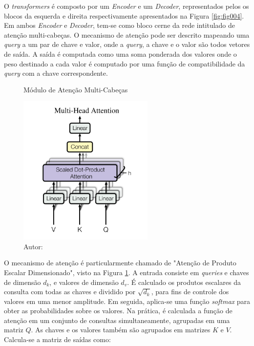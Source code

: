O \textit{transformers} é composto por um \textit{Encoder} e um \textit{Decoder}, representados pelos os blocos da esquerda e direita respectivamente apresentados na Figura \ref{fig:fig004}. Em ambos \textit{Encoder} e \textit{Decoder}, tem-se como bloco cerne da rede intitulado de atenção multi-cabeças. O mecanismo de atenção pode ser descrito mapeando uma \textit{query} a um par de chave e valor, onde a \textit{query}, a chave e o valor são todos vetores de saída. A saída é computada como uma soma ponderada dos valores onde o peso destinado a cada valor é computado por uma função de compatibilidade da \textit{query} com a chave correspondente.

\begin{figure}[htbp]
    \centering
    \caption{Módulo de Atenção Multi-Cabeças}
    \includegraphics[width=0.6\textwidth]{figures/fig005.png}
    \caption*{Autor:\cite{vaswaniAttentionAllYou2023}}
    \label{fig:fig005}
\end{figure}

O mecanismo de atenção é particularmente chamado de "Atenção de Produto Escalar Dimensionado", visto na Figura \ref{fig:fig005}. A entrada consiste em \textit{queries} e chaves de dimensão $d_{k}$, e valores de dimensão $d_{v}$. É calculado os produtos escalares da consulta com todas as chaves e dividido por $\sqrt{d_{k}}$, para fins de controle dos valores em uma menor amplitude. Em seguida, aplica-se uma função \textit{softmax} para obter as probabilidades sobre os valores. Na prática, é calculada a função de atenção em um conjunto de consultas simultaneamente, agrupadas em uma matriz $Q$. As chaves e os valores também são agrupados em matrizes $K$ e $V$. Calcula-se a matriz de saídas como:

